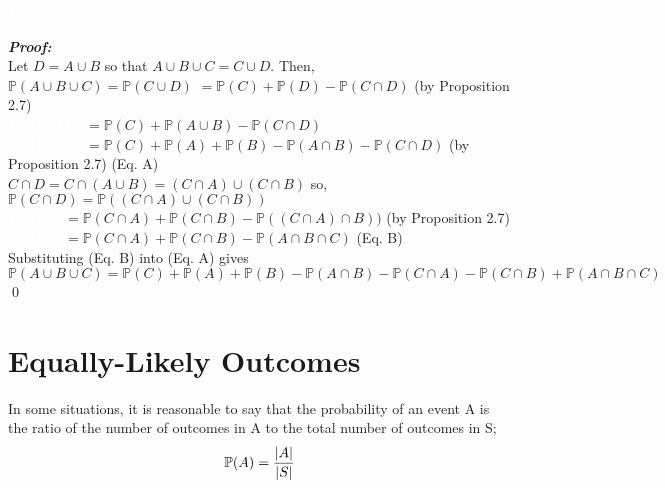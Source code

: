 \documentclass{report}
\newenvironment{cframedp}[1][Black]
  {\begin{tcolorbox}[colframe=#1,colback=white]}
  {\end{tcolorbox}}
\begin{document}
\textcolor{White}{123}

\begin{cframedp}
\textit{\textbf{Proof:}}\\
Let $D = A \cup B$ so that $A \cup B \cup C = C \cup D$. Then,\\

$\mathbb{P}(A \cup B \cup C) = \mathbb{P}(C \cup D)$
$= \mathbb{P}(C) + \mathbb{P}(D) - \mathbb{P}(C \cap D)$ (by Proposition 2.7)\\
\textcolor{White}{11111111111}$= \mathbb{P}(C) + \mathbb{P}(A \cup B) - \mathbb{P}(C \cap D)$\\
\textcolor{White}{11111111111}$= \mathbb{P}(C) + \mathbb{P}(A) + \mathbb{P}(B) - \mathbb{P}(A \cap B) - \mathbb{P}(C \cap D)$ (by Proposition 2.7) (Eq. A)\\

$C \cap D = C \cap (A \cup B) = (C \cap A) \cup (C \cap B)$ so,\\

$\mathbb{P}(C \cap D) = \mathbb{P}((C \cap A) \cup (C \cap B))$\\
\textcolor{White}{11111111}$= \mathbb{P}(C \cap A) + \mathbb{P}(C \cap B) - \mathbb{P}((C \cap A) \cap B))$ (by Proposition 2.7)\\
\textcolor{White}{11111111}$= \mathbb{P}(C \cap A) + \mathbb{P}(C \cap B) - \mathbb{P}(A \cap B \cap C)$ (Eq. B)\\

Substituting (Eq. B) into (Eq. A) gives\\
$\mathbb{P}(A \cup B \cup C) = \mathbb{P}(C) + \mathbb{P}(A) + \mathbb{P}(B) - \mathbb{P}(A \cap B) - \mathbb{P}(C \cap A) - \mathbb{P}(C \cap B) + \mathbb{P}(A \cap B \cap C)$\\
\qed
\end{cframedp}
\section{Equally-Likely Outcomes}

In some situations, it is reasonable to say that the probability of an event A is the ratio of the number of outcomes in A to the total number of outcomes in S;\\
\begin{equation*}
\mathbb{P}(A) = \frac{|A|}{|S|}\\
\end{equation*}
\end{document}
